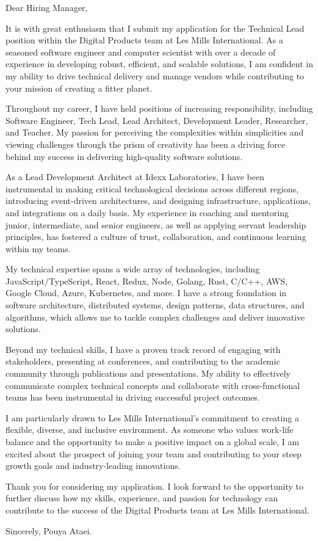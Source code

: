 \documentclass[10pt,a4paper,ragged2e]{altacv}
\begin{document}


\vspace{1em} %

Dear Hiring Manager,

It is with great enthusiasm that I submit my application for the Technical Lead position within the Digital Products team at Les Mills International. As a seasoned software engineer and computer scientist with over a decade of experience in developing robust, efficient, and scalable solutions, I am confident in my ability to drive technical delivery and manage vendors while contributing to your mission of creating a fitter planet.

Throughout my career, I have held positions of increasing responsibility, including Software Engineer, Tech Lead, Lead Architect, Development Leader, Researcher, and Teacher. My passion for perceiving the complexities within simplicities and viewing challenges through the prism of creativity has been a driving force behind my success in delivering high-quality software solutions.

As a Lead Development Architect at Idexx Laboratories, I have been instrumental in making critical technological decisions across different regions, introducing event-driven architectures, and designing infrastructure, applications, and integrations on a daily basis. My experience in coaching and mentoring junior, intermediate, and senior engineers, as well as applying servant leadership principles, has fostered a culture of trust, collaboration, and continuous learning within my teams.

My technical expertise spans a wide array of technologies, including JavaScript/TypeScript, React, Redux, Node, Golang, Rust, C/C++, AWS, Google Cloud, Azure, Kubernetes, and more. I have a strong foundation in software architecture, distributed systems, design patterns, data structures, and algorithms, which allows me to tackle complex challenges and deliver innovative solutions.

Beyond my technical skills, I have a proven track record of engaging with stakeholders, presenting at conferences, and contributing to the academic community through publications and presentations. My ability to effectively communicate complex technical concepts and collaborate with cross-functional teams has been instrumental in driving successful project outcomes.

I am particularly drawn to Les Mills International's commitment to creating a flexible, diverse, and inclusive environment. As someone who values work-life balance and the opportunity to make a positive impact on a global scale, I am excited about the prospect of joining your team and contributing to your steep growth goals and industry-leading innovations.

Thank you for considering my application. I look forward to the opportunity to further discuss how my skills, experience, and passion for technology can contribute to the success of the Digital Products team at Les Mills International.


\vspace{2em} %

Sincerely, \newline
Pouya Ataei.
\end{document}
